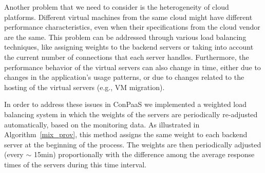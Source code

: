 
Another problem that we need to consider is the heterogeneity of cloud platforms.
Different virtual machines from the same cloud might have different performance
characteristics, even when their specifications from the cloud vendor are the same.
This problem can be addressed through various load balancing techniques, like
assigning weights to the backend servers or taking into account the current number
of connections that each server handles. Furthermore, the performance behavior
of the virtual servers can also change in time, either due to changes in
the application's usage patterns, or due to changes related to the hosting
of the virtual servers (e.g., VM migration).

In order to address these issues in ConPaaS we implemented a weighted load balancing
system in which the weights of the servers are periodically re-adjusted
automatically, based on the monitoring data. As illustrated in 
Algorithm~\ref{mix_prov}, this method assigns the same weight to each 
backend server at the beginning of the process. The weights are then periodically
adjusted (every $\sim$ 15min) proportionally with the difference among the
average response times of the servers during this time interval.


